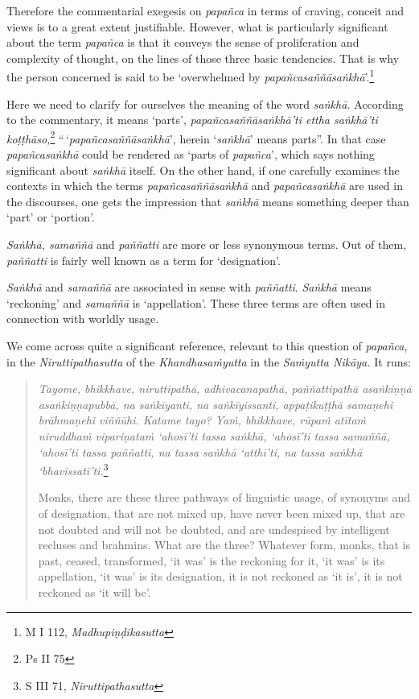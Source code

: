 Therefore the commentarial exegesis on \emph{papañca} in terms of craving, conceit and views is to a great extent justifiable. However, what is particularly significant about the term \emph{papañca} is that it conveys the sense of proliferation and complexity of thought, on the lines of those three basic tendencies. That is why the person concerned is said to be `overwhelmed by \emph{papañcasaññāsaṅkhā}'.\footnote{M I 112, \emph{Madhupiṇḍikasutta}}

Here we need to clarify for ourselves the meaning of the word \emph{saṅkhā.} According to the commentary, it means `parts', \emph{papañcasaññāsaṅkhā'ti ettha saṅkhā'ti koṭṭhāso,}\footnote{Ps II 75} ``\,`\emph{papañcasaññāsaṅkhā}', herein `\emph{saṅkhā}' means parts''. In that case \emph{papañcasaṅkhā} could be rendered as `parts of \emph{papañca}', which says nothing significant about \emph{saṅkhā} itself. On the other hand, if one carefully examines the contexts in which the terms \emph{papañcasaññāsaṅkhā} and \emph{papañcasaṅkhā} are used in the discourses, one gets the impression that \emph{saṅkhā} means something deeper than `part' or `portion'.

\emph{Saṅkhā, samaññā} and \emph{paññatti} are more or less synonymous terms. Out of them, \emph{paññatti} is fairly well known as a term for `designation'.

\emph{Saṅkhā} and \emph{samaññā} are associated in sense with \emph{paññatti}. \emph{Saṅkhā} means `reckoning' and \emph{samaññā} is `appellation'. These three terms are often used in connection with worldly usage.

We come across quite a significant reference, relevant to this question of \emph{papañca}, in the \emph{Niruttipathasutta} of the \emph{Khandhasaṁyutta} in the \emph{Saṁyutta Nikāya.} It runs:

\begin{quote}
\emph{Tayome, bhikkhave, niruttipathā, adhivacanapathā, paññattipathā asaṅkiṇṇā asaṅkiṇṇapubbā, na saṅkīyanti, na saṅkīyissanti, appaṭikuṭṭhā samaṇehi brāhmaṇehi viññūhi. Katame tayo? Yaṁ, bhikkhave, rūpaṁ atītaṁ niruddhaṁ vipariṇataṁ `ahosī'ti tassa saṅkhā, `ahosī'ti tassa samaññā, `ahosī'ti tassa paññatti, na tassa saṅkhā `atthī'ti, na tassa saṅkhā `bhavissatī'ti.}\footnote{S III 71, \emph{Niruttipathasutta}}

Monks, there are these three pathways of linguistic usage, of synonyms and of designation, that are not mixed up, have never been mixed up, that are not doubted and will not be doubted, and are undespised by intelligent recluses and brahmins. What are the three? Whatever form, monks, that is past, ceased, transformed, `it was' is the reckoning for it, `it was' is its appellation, `it was' is its designation, it is not reckoned as `it is', it is not reckoned as `it will be'.
\end{quote}

